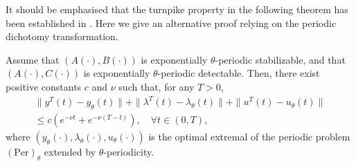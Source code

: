 \documentclass{IEEEtran}
\begin{document}
	It should be emphasised that the turnpike property in the following theorem has been established in \cite[Theorem~2.1]{TZZ2}. Here we give an alternative proof relying on the periodic dichotomy transformation.
	\begin{theorem}\label{tp}
		Assume that $(A(\cdot),B(\cdot))$ is exponentially $\theta$-periodic stabilizable, and that $(A(\cdot),C(\cdot))$ is exponentially $\theta$-periodic detectable. Then, there exist positive constants $c$ and $\nu$ such that, for any $T>0$,
		\begin{multline}\label{19}
			\|y^T(t)-y_\theta(t)\| + \|\lambda^T(t)-\lambda_\theta(t)\| + \|u^T(t)-u_\theta(t)\| \\ \leq c(e^{-\nu t} + e^{-\nu (T-t)} ), \quad \forall t \in (0,T),
		\end{multline}
		where $(y_\theta(\cdot),\lambda_\theta(\cdot),u_\theta(\cdot))$ is the optimal extremal of the periodic problem $(\text{Per})_\theta$ extended by $\theta$-periodicity.
	\end{theorem}
\end{document}
